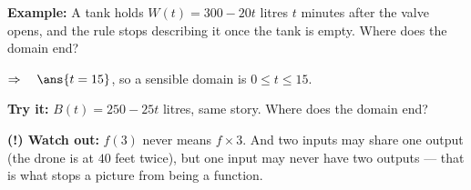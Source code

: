 \documentclass[12pt]{article}
\begin{document}
\begin{examplebox}
\textbf{Example:} \quad A tank holds $W(t) = 300 - 20t$ litres $t$ minutes
after the valve opens, and the rule stops describing it once the tank is empty.
Where does the domain end?

$\Rightarrow\quad \ans{t = 15}$, so a sensible domain is $0 \le t \le 15$.
\end{examplebox}

\begin{tryitbox}
\textbf{Try it:} \quad $B(t) = 250 - 25t$ litres, same story. Where does the
domain end?\\[2pt]
\end{tryitbox}

\begin{watchoutbox}
\textbf{(!) Watch out:} $f(3)$ never means $f \times 3$. And two inputs may
share one output (the drone is at $40$ feet twice), but one input may never
have two outputs --- that is what stops a picture from being a function.
\end{watchoutbox}
\end{document}
